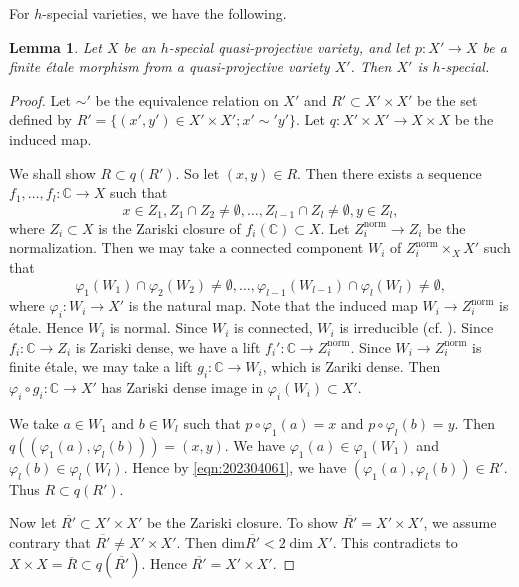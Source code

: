 \documentclass[11pt,english]{smfart}
\theoremstyle{plain}
\newtheorem{lem}[thm]{Lemma}
\theoremstyle{definition}
\theoremstyle{remark}
\numberwithin{equation}{subsection}
\theoremstyle{plain}
\begin{document}
For $h$-special varieties, we have the following.



\begin{lem}\label{lem:202304061}
Let $X$ be an $h$-special quasi-projective variety, and let $p:X'\to X$ be a finite \'etale morphism from a quasi-projective variety $X'$.
Then $X'$ is $h$-special.
\end{lem}

\begin{proof}
Let $\sim'$ be the equivalence relation on $X'$ and $R'\subset X'\times X'$ be the set defined by $R'=\{(x',y')\in X'\times X'; x'\sim'y'\}$.
Let $q:X'\times X'\to X\times X$ be the induced map.

We shall show $R\subset q(R')$.
So let $(x,y)\in R$.
Then there exists a sequence $f_1,\ldots,f_l:\mathbb C\to X$ such that 
$$x\in Z_1, Z_1\cap Z_2\not=\emptyset,\ldots,Z_{l-1}\cap Z_l\not=\emptyset, y\in Z_l,$$
where $Z_i\subset X$ is the Zariski closure of $f_i(\mathbb C)\subset X$.
Let $Z_i^{\mathrm{norm}}\to Z_i$ be the normalization.
Then we may take a connected component $W_i$ of $Z_i^{\mathrm{norm}}\times_XX'$ such that 
\begin{equation}\label{eqn:202304061}
\varphi_1(W_1)\cap \varphi_{2}(W_{2})\not=\emptyset,\ldots, \varphi_{l-1}(W_{l-1})\cap \varphi_{l}(W_{l})\not=\emptyset,
\end{equation}
where $\varphi_i:W_i\to X'$ is the natural map.
Note that the induced map $W_i\to Z_i^{\mathrm{norm}}$ is \'etale.
Hence $W_i$ is normal.
Since $W_i$ is connected, $W_i$ is irreducible (cf. \cite[\href{https://stacks.math.columbia.edu/tag/0357}{Tag 0357}]{stacks-project}). 
Since $f_i:\mathbb C\to Z_i$ is Zariski dense, we have a lift $f_i':\mathbb C\to Z_i^{\mathrm{norm}}$.
Since $W_i\to Z_i^{\mathrm{norm}}$ is finite \'etale, we may take a lift $g_i:\mathbb C\to W_i$, which is Zariki dense.
Then $\varphi_i\circ g_i:\mathbb C\to X'$ has Zariski dense image in $\varphi_i(W_i)\subset X'$.

We take $a\in W_1$ and $b\in W_l$ such that $p\circ\varphi_1(a)=x$ and $p\circ\varphi_l(b)=y$.
Then $q((\varphi_1(a),\varphi_l(b)))=(x,y)$.
We have $\varphi_1(a)\in\varphi_1(W_1)$ and $\varphi_l(b)\in\varphi_l(W_l)$.
Hence by \eqref{eqn:202304061}, we have $(\varphi_1(a),\varphi_l(b))\in R'$.
Thus $R\subset q(R')$.

Now let $\overline{R'}\subset X'\times X'$ be the Zariski closure.
To show $\overline{R'}= X'\times X'$, we assume contrary that $\overline{R'}\not= X'\times X'$.
Then $\mathrm{dim}\overline{R'}<2\dim X'$.
This contradicts to $X\times X=\overline{R}\subset q(\overline{R'})$.
Hence $\overline{R'}= X'\times X'$.
\end{proof}
\end{document}
